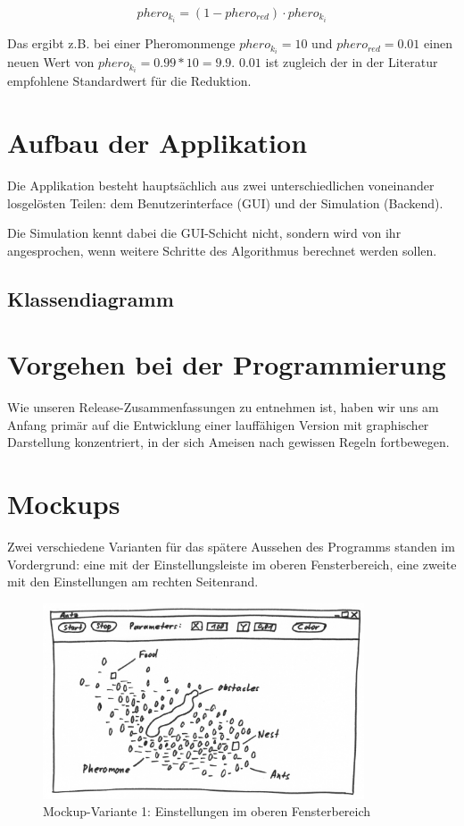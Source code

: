 \[ phero_{k_i} = (1 - phero_{red}) \cdot phero_{k_i} \]

Das ergibt z.B. bei einer Pheromonmenge $phero_{k_i} = 10$ und $phero_{red} = 0.01$ einen neuen Wert von $phero_{k_i} = 0.99 * 10 = 9.9$. $0.01$ ist zugleich der in der Literatur empfohlene Standardwert für die Reduktion.

\section{Aufbau der Applikation}

Die Applikation besteht hauptsächlich aus zwei unterschiedlichen voneinander losgelösten Teilen: dem Benutzerinterface (GUI) und der Simulation (Backend).

Die Simulation kennt dabei die GUI-Schicht nicht, sondern wird von ihr angesprochen, wenn weitere Schritte des Algorithmus berechnet werden sollen.

\subsection{Klassendiagramm}



\section{Vorgehen bei der Programmierung}

Wie unseren Release-Zusammenfassungen zu entnehmen ist, haben wir uns am Anfang primär auf die Entwicklung einer lauffähigen Version mit graphischer Darstellung konzentriert, in der sich Ameisen nach gewissen Regeln fortbewegen. 

\section{Mockups}

Zwei verschiedene Varianten für das spätere Aussehen des Programms standen im Vordergrund: eine mit der Einstellungsleiste im oberen Fensterbereich, eine zweite mit den Einstellungen am rechten Seitenrand.

\begin{figure}[h]
  \centering
	\includegraphics [width=0.85\textwidth]{images/Antz_Mockup_1_sw.png} 
	\caption{Mockup-Variante 1: Einstellungen im oberen Fensterbereich}
\end{figure}


